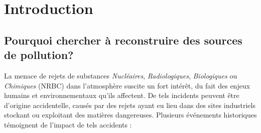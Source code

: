 \chapter{Introduction}

\section{Pourquoi chercher à reconstruire des sources de pollution?}
	La menace de rejets de substances \textit{Nucléaires}, \textit{Radiologiques}, \textit{{Biologiques}} ou \textit{Chimiques} (NRBC) dans l'atmosphère suscite un fort intérêt, du fait des enjeux humains et environnementaux qu'ils affectent. De tels incidents peuvent être d'origine accidentelle, causés par des rejets ayant eu lieu dans des sites industriels stockant ou exploitant des matières dangereuses. Plusieurs événements historiques témoignent de l'impact de tels accidents :\\
